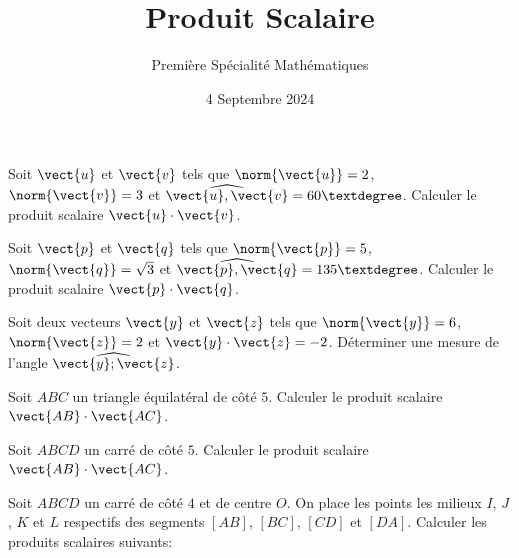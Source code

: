 \documentclass{exam}
\title{Produit Scalaire}
\author{Première Spécialité Mathématiques}
\date{4 Septembre 2024}
\begin{document}
\maketitle
\begin{questions}
\question Soit $\vect{u}$ et $\vect{v}$ tels que $\norm{\vect{u}} = 2$, $\norm{\vect{v}} = 3$ et $\widehat{\vect{u},\vect{v}} = 60°$. Calculer le produit scalaire $\vect{u} \cdot \vect{v}$.
\vspace*{0.5cm}

\question Soit $\vect{p}$ et $\vect{q}$ tels que $\norm{\vect{p}} = 5$, $\norm{\vect{q}} = \sqrt{3}$ et $\widehat{\vect{p},\vect{q}} = 135°$. Calculer le produit scalaire $\vect{p} \cdot \vect{q}$.
\vspace*{0.5cm}

\question Soit deux vecteurs $\vect{y}$ et $\vect{z}$ tels que $\norm{\vect{y}} = 6$, $\norm{\vect{z}} = 2$ et $\vect{y} \cdot \vect{z} = -2$. Déterminer une mesure de l'angle $\widehat{\vect{y};\vect{z}}$.
\vspace*{0.5cm}

\question Soit $ABC$ un triangle équilatéral de côté $5$. Calculer le produit scalaire $\vect{AB} \cdot \vect{AC}$.
\vspace*{0.5cm}

\question Soit $ABCD$ un carré de côté $5$. Calculer le produit scalaire $\vect{AB} \cdot \vect{AC}$.
\vspace*{0.5cm}

\question Soit $ABCD$ un carré de côté $4$ et de centre $O$. On place les points les milieux $I$, $J$, $K$ et $L$ respectifs des segments $[AB]$, $[BC]$, $[CD]$ et $[DA]$. Calculer les produits scalaires suivants:
\vspace*{0.5cm}


\end{questions}
\end{document}
